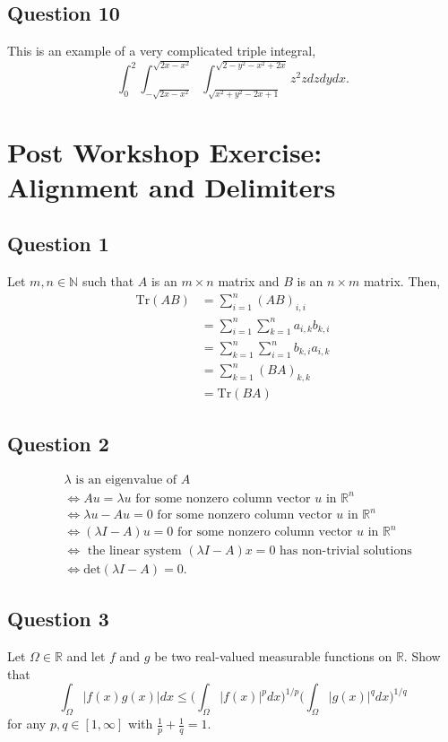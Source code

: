 \documentclass[12pt]{article}
\begin{document}
\subsection{Question 10}
This is an example of a very complicated triple integral, $$\int_0^2 \int_{-\sqrt{2x-x^2}}^{\sqrt{2x-x^2}}\int_{\sqrt{x^2+y^2-2x+1}}^{\sqrt{2-y^2-x^2+2x}}z^2zdzdydx.$$
\section{Post Workshop Exercise: Alignment and Delimiters}
\subsection{Question 1}
Let $m,n\in\mathbb{N}$ such that $A$ is an $m\times n$ matrix and $B$ is an $n\times m$ matrix. Then,
\begin{align*}
    \text{Tr}(AB)&=\sum_{i=1}^n(AB)_{i,i}\\
    &= \sum_{i=1}^n\sum_{k=1}^na_{i,k}b_{k,i}\\
    &= \sum_{k=1}^n\sum_{i=1}^nb_{k,i}a_{i,k}\\
    &= \sum_{k=1}^n(BA)_{k,k}\\
    &= \text{Tr}(BA)
\end{align*}
\subsection{Question 2}
\begin{align*}
    &\lambda \text{ is an eigenvalue of } A\\
    &\Leftrightarrow Au=\lambda u\text{ for some nonzero column vector } u \text{ in } \mathbb{R}^n\\
    &\Leftrightarrow \lambda u-Au=0 \text{ for some nonzero column vector } u \text{ in } \mathbb{R}^n\\
    &\Leftrightarrow (\lambda I-A)u=0\text{ for some nonzero column vector } u\text{ in }\mathbb{R}^n\\
    &\Leftrightarrow \text{ the linear system }(\lambda I-A)x=0\text{ has non-trivial solutions}\\
    &\Leftrightarrow \text{det}(\lambda I-A)=0.
\end{align*}
\subsection{Question 3}
Let $\Omega\in\mathbb{R}$ and let $f$ and $g$ be two real-valued measurable functions on $\mathbb{R}$. Show that $$\int_\Omega |f(x)g(x)|dx\leq\Bigg(\int_\Omega |f(x)|^pdx\Bigg)^{1/p}\Bigg(\int_\Omega |g(x)|^qdx\Bigg)^{1/q}$$ for any $p,q\in [1,\infty]$ with $\frac{1}{p}+\frac{1}{q}=1$.
\end{document}
